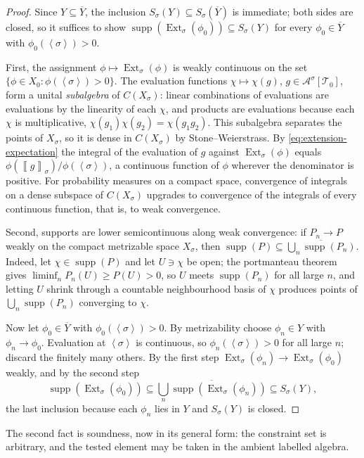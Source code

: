\documentclass[11pt]{article}
\theoremstyle{definition}
\newcommand{\A}{\mathcal{A}}
\newcommand{\T}{\mathcal{T}}
\newcommand{\Ext}{\operatorname{Ext}}
\newcommand{\supp}{\operatorname{supp}}
\newcommand{\brak}[1]{\left\langle #1\right\rangle}
\newcommand{\avg}[2]{\left\llbracket #1 \right\rrbracket_{#2}}
\begin{document}
\begin{proof}
Since $Y\subseteq\overline Y$, the inclusion $S_\sigma(Y)\subseteq S_\sigma(\overline Y)$
is immediate; both sides are closed, so it suffices to show
$\supp(\Ext_\sigma(\phi_0))\subseteq S_\sigma(Y)$ for every $\phi_0\in\overline Y$ with
$\phi_0(\brak\sigma)>0$.

First, the assignment $\phi\mapsto\Ext_\sigma(\phi)$ is weakly continuous on the set
$\{\phi\in X_0:\phi(\brak\sigma)>0\}$.  The evaluation functions
$\chi\mapsto\chi(g)$, $g\in\A^\sigma[\T_0]$, form a unital \emph{subalgebra} of
$C(X_\sigma)$: linear combinations of evaluations are evaluations by the linearity of
each $\chi$, and products are evaluations because each $\chi$ is multiplicative,
$\chi(g_1)\chi(g_2)=\chi(g_1g_2)$.  This subalgebra separates the points of $X_\sigma$,
so it is dense in $C(X_\sigma)$ by Stone--Weierstrass.  By
\eqref{eq:extension-expectation} the integral of the evaluation of $g$ against
$\Ext_\sigma(\phi)$ equals $\phi(\avg{g}{\sigma})/\phi(\brak\sigma)$, a continuous
function of $\phi$ wherever the denominator is positive.  For probability measures on a
compact space, convergence of integrals on a dense subspace of $C(X_\sigma)$ upgrades to
convergence of the integrals of every continuous function, that is, to weak convergence.

Second, supports are lower semicontinuous along weak convergence: if $P_n\to P$ weakly on
the compact metrizable space $X_\sigma$, then
$\supp(P)\subseteq\overline{\bigcup_n\supp(P_n)}$.  Indeed, let $\chi\in\supp(P)$ and let
$U\ni\chi$ be open; the portmanteau theorem gives $\liminf_nP_n(U)\ge P(U)>0$, so $U$
meets $\supp(P_n)$ for all large $n$, and letting $U$ shrink through a countable
neighbourhood basis of $\chi$ produces points of $\bigcup_n\supp(P_n)$ converging to
$\chi$.

Now let $\phi_0\in\overline Y$ with $\phi_0(\brak\sigma)>0$.  By metrizability choose
$\phi_n\in Y$ with $\phi_n\to\phi_0$.  Evaluation at $\brak\sigma$ is continuous, so
$\phi_n(\brak\sigma)>0$ for all large $n$; discard the finitely many others.  By the
first step $\Ext_\sigma(\phi_n)\to\Ext_\sigma(\phi_0)$ weakly, and by the second step
\[
  \supp(\Ext_\sigma(\phi_0))
  \subseteq
  \overline{\bigcup_n\supp(\Ext_\sigma(\phi_n))}
  \subseteq
  S_\sigma(Y),
\]
the last inclusion because each $\phi_n$ lies in $Y$ and $S_\sigma(Y)$ is closed.
\end{proof}

The second fact is soundness, now in its general form: the constraint set is arbitrary,
and the tested element may be taken in the ambient labelled algebra.
\end{document}

